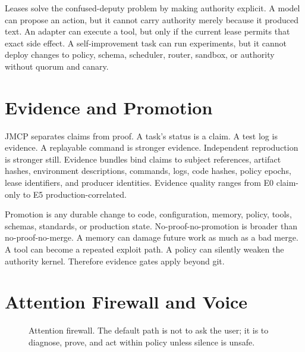 \documentclass[journal,onecolumn]{IEEEtran}
\begin{document}
Leases solve the confused-deputy problem by making authority explicit. A model can propose an action, but it cannot carry authority merely because it produced text. An adapter can execute a tool, but only if the current lease permits that exact side effect. A self-improvement task can run experiments, but it cannot deploy changes to policy, schema, scheduler, router, sandbox, or authority without quorum and canary.

\section{Evidence and Promotion}
JMCP separates claims from proof. A task's status is a claim. A test log is evidence. A replayable command is stronger evidence. Independent reproduction is stronger still. Evidence bundles bind claims to subject references, artifact hashes, environment descriptions, commands, logs, code hashes, policy epochs, lease identifiers, and producer identities. Evidence quality ranges from E0 claim-only to E5 production-correlated.

Promotion is any durable change to code, configuration, memory, policy, tools, schemas, standards, or production state. No-proof-no-promotion is broader than no-proof-no-merge. A memory can damage future work as much as a bad merge. A tool can become a repeated exploit path. A policy can silently weaken the authority kernel. Therefore evidence gates apply beyond git.

\section{Attention Firewall and Voice}
\begin{figure}[t]
\centering
{}
\caption{Attention firewall. The default path is not to ask the user; it is to diagnose, prove, and act within policy unless silence is unsafe.}
\end{figure}
\end{document}

